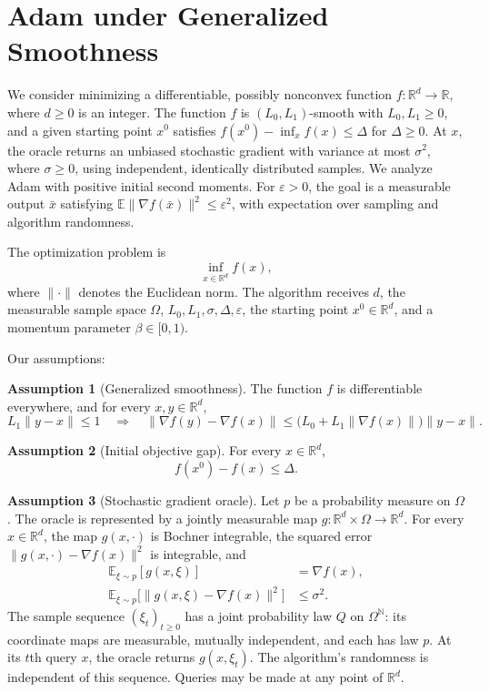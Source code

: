 \documentclass[10pt]{article}
\theoremstyle{definition}
\newtheorem{assumption}{Assumption}
\begin{document}
\section*{Adam under Generalized Smoothness}
We consider minimizing a differentiable, possibly nonconvex function $f:\mathbb{R}^d\to\mathbb{R}$, where $d\geq0$ is an integer. The function $f$ is $(L_0,L_1)$-smooth with $L_0,L_1\geq0$, and a given starting point $x^0$ satisfies $f(x^0)-\inf_x f(x)\leq\Delta$ for $\Delta\geq0$. At $x$, the oracle returns an unbiased stochastic gradient with variance at most $\sigma^2$, where $\sigma\geq0$, using independent, identically distributed samples. We analyze Adam with positive initial second moments. For $\varepsilon>0$, the goal is a measurable output $\bar{x}$ satisfying $\mathbb{E}\|\nabla f(\bar{x})\|^2\leq\varepsilon^2$, with expectation over sampling and algorithm randomness.

The optimization problem is
\[
\inf_{x\in\mathbb{R}^d} f(x),
\]
where $\|\cdot\|$ denotes the Euclidean norm. The algorithm receives $d$, the measurable sample space $\Omega$, $L_0,L_1,\sigma,\Delta,\varepsilon$, the starting point $x^0\in\mathbb{R}^d$, and a momentum parameter $\beta\in[0,1)$.

Our assumptions:
\begin{assumption}[Generalized smoothness]
The function $f$ is differentiable everywhere, and for every $x,y\in\mathbb{R}^d$,
\[
L_1\|y-x\|\leq1
\quad\Longrightarrow\quad
\|\nabla f(y)-\nabla f(x)\|
\leq \bigl(L_0+L_1\|\nabla f(x)\|\bigr)\|y-x\|.
\]
\end{assumption}

\begin{assumption}[Initial objective gap]
For every $x\in\mathbb{R}^d$,
\[
f(x^0)-f(x)\leq\Delta.
\]
\end{assumption}

\begin{assumption}[Stochastic gradient oracle]
Let $p$ be a probability measure on $\Omega$. The oracle is represented by a jointly measurable map $g:\mathbb{R}^d\times\Omega\to\mathbb{R}^d$. For every $x\in\mathbb{R}^d$, the map $g(x,\cdot)$ is Bochner integrable, the squared error $\|g(x,\cdot)-\nabla f(x)\|^2$ is integrable, and
\[
\begin{aligned}
\mathbb{E}_{\xi\sim p}[g(x,\xi)]&=\nabla f(x),\\
\mathbb{E}_{\xi\sim p}\bigl[\|g(x,\xi)-\nabla f(x)\|^2\bigr]&\leq\sigma^2.
\end{aligned}
\]
The sample sequence $(\xi_t)_{t\geq0}$ has a joint probability law $Q$ on $\Omega^{\mathbb{N}}$: its coordinate maps are measurable, mutually independent, and each has law $p$. At its $t$th query $x$, the oracle returns $g(x,\xi_t)$. The algorithm's randomness is independent of this sequence. Queries may be made at any point of $\mathbb{R}^d$.
\end{assumption}
\end{document}

